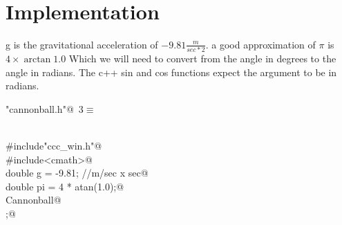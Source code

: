 \documentclass{article}
\begin{document}
\\


\section{Implementation}
g is the gravitational acceleration of $-9.81 \frac{m}{sec*2}$.
a good approximation of $\pi$ is $ 4 \times \arctan 1.0$ Which we will
need to convert from the angle in degrees to the angle in radians.
The c++ sin and cos functions expect the argument to be in radians.
\begin{flushleft} \small
\begin{minipage}{\linewidth}\label{scrap1}\raggedright\small
{} \verb@"cannonball.h"@\nobreak\ {\footnotesize {3}}$\equiv$
\vspace{-1ex}
\begin{list}{}{} \item
\mbox{}\verb@@\\
\mbox{}\verb@#include"ccc_win.h"@\\
\mbox{}\verb@#include<cmath>@\\
\mbox{}\verb@const double g = -9.81; //m/sec x sec@\\
\mbox{}\verb@const double pi = 4 * atan(1.0);@\\
\mbox{}\verb@class Cannonball@\\
\mbox{};@\\
\mbox{}\verb@@{\NWsep}
\end{list}
\vspace{-1.5ex}
\footnotesize
\begin{list}{}{\setlength{\itemsep}{-\parsep}\setlength{\itemindent}{-\leftmargin}}

\item{}
\end{list}
\end{minipage}\vspace{4ex}
\end{flushleft}
\end{document}
